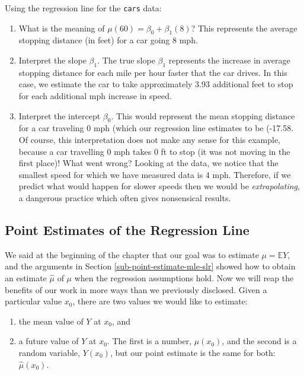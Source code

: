 \documentclass[]{book}
\providecommand{\tightlist}{%
  \setlength{\itemsep}{0pt}\setlength{\parskip}{0pt}}
\numberwithin{equation}{chapter}
\numberwithin{figure}{chapter}
\theoremstyle{plain}
\theoremstyle{definition}
\theoremstyle{remark}
\theoremstyle{definition}
\theoremstyle{definition}
\theoremstyle{remark}
\let\BeginKnitrBlock\begin \let\EndKnitrBlock\end
\begin{document}
\bigskip

\BeginKnitrBlock{example}
\protect\hypertarget{ex:regline-cars-interpret}{}{\label{ex:regline-cars-interpret}}Using
the regression line for the \texttt{cars} data:
\EndKnitrBlock{example}

\begin{enumerate}
\def\labelenumi{\arabic{enumi}.}
\tightlist
\item
  What is the meaning of \(\mu(60) = \beta_{0} + \beta_{1}(8)\)? This
  represents the average stopping distance (in feet) for a car going 8
  mph.
\item
  Interpret the slope \(\beta_{1}\). The true slope \(\beta_{1}\)
  represents the increase in average stopping distance for each mile per
  hour faster that the car drives. In this case, we estimate the car to
  take approximately 3.93 additional feet to stop for each additional
  mph increase in speed.
\item
  Interpret the intercept \(\beta_{0}\). This would represent the mean
  stopping distance for a car traveling 0 mph (which our regression line
  estimates to be (-17.58. Of course, this interpretation does not make
  any sense for this example, because a car travelling 0 mph takes 0 ft
  to stop (it was not moving in the first place)! What went wrong?
  Looking at the data, we notice that the smallest speed for which we
  have measured data is 4 mph. Therefore, if we predict what would
  happen for slower speeds then we would be \emph{extrapolating}, a
  dangerous practice which often gives nonsensical results.
\end{enumerate}

\subsection{Point Estimates of the Regression
Line}\label{sub-slr-point-est-regline}

We said at the beginning of the chapter that our goal was to estimate
\(\mu = \mathbb{E} Y\), and the arguments in Section
\ref{sub-point-estimate-mle-slr} showed how to obtain an estimate
\(\hat{\mu}\) of \(\mu\) when the regression assumptions hold. Now we
will reap the benefits of our work in more ways than we previously
disclosed. Given a particular value \(x_{0}\), there are two values we
would like to estimate:

\begin{enumerate}
\def\labelenumi{\arabic{enumi}.}
\tightlist
\item
  the mean value of \(Y\) at \(x_{0}\), and
\item
  a future value of \(Y\) at \(x_{0}\). The first is a number,
  \(\mu(x_{0})\), and the second is a random variable, \(Y(x_{0})\), but
  our point estimate is the same for both: \(\hat{\mu}(x_{0})\).
\end{enumerate}
\end{document}
